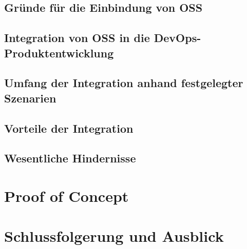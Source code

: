 \documentclass[12pt,titlepage]{article}
\begin{document}
\subsection{Gründe für die Einbindung von OSS}


\subsection{Integration von OSS in die DevOps-Produktentwicklung}


\subsection{Umfang der Integration anhand festgelegter Szenarien}


\subsection{Vorteile der Integration}


\subsection{Wesentliche Hindernisse}



\section{Proof of Concept}




\section{Schlussfolgerung und Ausblick}






\newpage


\end{document}

